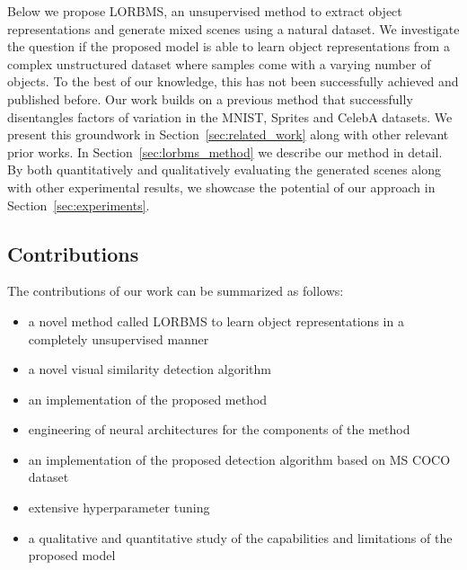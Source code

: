 \documentclass[12pt,a4paper]{article}
\begin{document}
\vspace{5mm}
Below we propose LORBMS, an unsupervised method to extract object representations and generate mixed scenes using a natural dataset. We investigate the question if the proposed model is able to learn object representations from a complex unstructured dataset where samples come with a varying number of objects. To the best of our knowledge, this has not been successfully achieved and published before. Our work builds on a previous method that successfully disentangles factors of variation in the MNIST, Sprites and CelebA datasets. We present this groundwork in Section~\ref{sec:related_work} along with other relevant prior works. In Section~\ref{sec:lorbms_method} we describe our method in detail. By both quantitatively and qualitatively evaluating the generated scenes along with other experimental results, we showcase the potential of our approach in Section~\ref{sec:experiments}.  

\subsection{Contributions}
The contributions of our work can be summarized as follows:
\begin{itemize}
  \item a novel method called LORBMS to learn object representations in a completely unsupervised manner
  \item a novel visual similarity detection algorithm
  \item an implementation of the proposed method
  \item engineering of neural architectures for the components of the method
  \item an implementation of the proposed detection algorithm based on MS COCO dataset
  \item extensive hyperparameter tuning
  \item a qualitative and quantitative study of the capabilities and limitations of the proposed model
\end{itemize}
\end{document}
